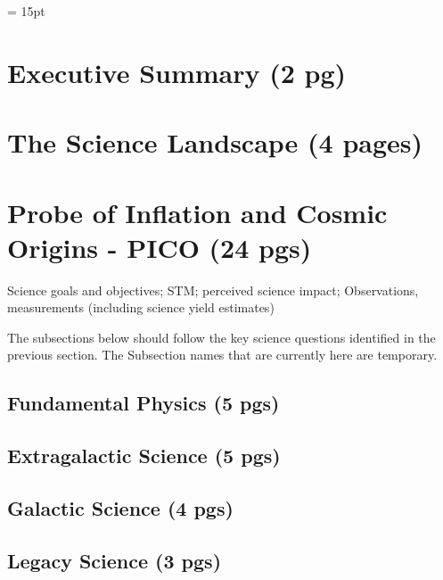 \documentclass[12pt]{article}
\begin{document}


\setlength{\baselineskip}{0.96\baselineskip} %
\setlength{\parskip}{1.\parskip}

\parindent = 15pt


\setcounter{page}{0}
\setcounter{figure}{0}

\newpage

%

\section{Executive Summary (2 pg)} 


\section{The Science Landscape (4 pages)}


\section{Probe of Inflation and Cosmic Origins - PICO (24 pgs)}

Science goals and objectives; STM; perceived science impact; Observations, measurements (including science yield estimates)

The subsections below should follow the key science questions identified in the previous section. The Subsection names that are currently here are temporary. 
 
   \subsection{Fundamental Physics (5 pgs)}
   

   \subsection{Extragalactic Science (5 pgs)}
   

   \subsection{Galactic Science (4 pgs)}
   

   \subsection{Legacy Science (3 pgs)}
   
\end{document}
